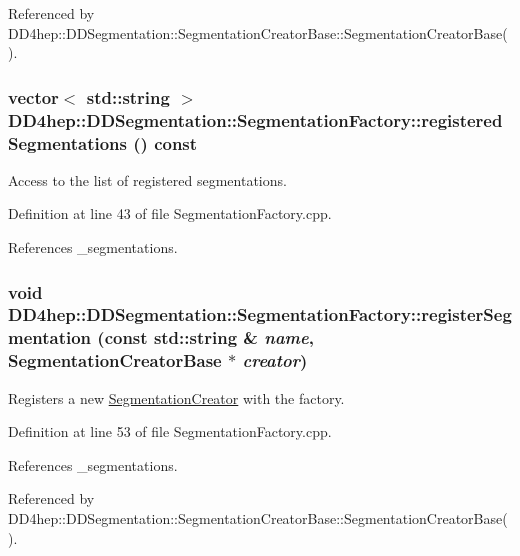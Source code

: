 Referenced by DD4hep::DDSegmentation::SegmentationCreatorBase::SegmentationCreatorBase().\hypertarget{class_d_d4hep_1_1_d_d_segmentation_1_1_segmentation_factory_ada61afcde940d71133c810dd4b4424e0}{
\subsubsection[{registeredSegmentations}]{\setlength{\rightskip}{0pt plus 5cm}vector$<$ std::string $>$ DD4hep::DDSegmentation::SegmentationFactory::registeredSegmentations () const}}
\label{class_d_d4hep_1_1_d_d_segmentation_1_1_segmentation_factory_ada61afcde940d71133c810dd4b4424e0}


Access to the list of registered segmentations. 

Definition at line 43 of file SegmentationFactory.cpp.

References \_\-segmentations.\hypertarget{class_d_d4hep_1_1_d_d_segmentation_1_1_segmentation_factory_afb766eaf4c362ae719d29ca764e8cdeb}{
\subsubsection[{registerSegmentation}]{\setlength{\rightskip}{0pt plus 5cm}void DD4hep::DDSegmentation::SegmentationFactory::registerSegmentation (const std::string \& {\em name}, \/  {\bf SegmentationCreatorBase} $\ast$ {\em creator})}}
\label{class_d_d4hep_1_1_d_d_segmentation_1_1_segmentation_factory_afb766eaf4c362ae719d29ca764e8cdeb}


Registers a new \hyperlink{class_d_d4hep_1_1_d_d_segmentation_1_1_segmentation_creator}{SegmentationCreator} with the factory. 

Definition at line 53 of file SegmentationFactory.cpp.

References \_\-segmentations.

Referenced by DD4hep::DDSegmentation::SegmentationCreatorBase::SegmentationCreatorBase().

